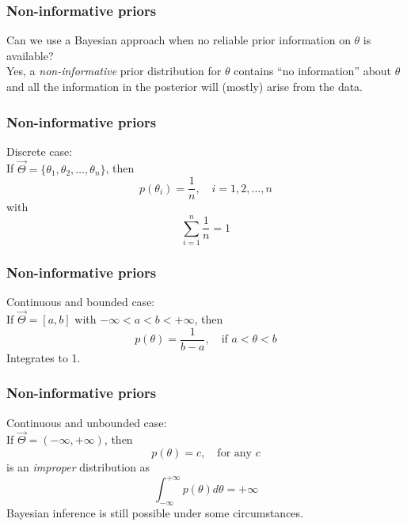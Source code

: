 \documentclass{beamer}
\newcommand{\1}{\ensuremath{\mathbf{1}}}
\begin{document}
%
%
%
\begin{frame}\frametitle{Non-informative priors}
	Can we use a Bayesian approach when no reliable prior information on $\theta$ is available?\\[2ex]
	Yes, a \emph{non-informative} prior distribution for $\theta$ contains ``no information'' about $\theta$ and all the information in the posterior will (mostly) arise from the data.
\end{frame}
%
%
%
\begin{frame}\frametitle{Non-informative priors}
	Discrete case:\\[1.5ex]
	If $\vec\Theta = \{\theta_1, \theta_2, \ldots, \theta_n\}$, then
	\begin{equation}
		p(\theta_i) = \frac{1}{n}, \quad i=1,2,\ldots,n	
	\end{equation}
	with
	\begin{equation}
		\sum_{i=1}^n \frac{1}{n} = 1
	\end{equation}
\end{frame}
%
%
%
\begin{frame}\frametitle{Non-informative priors}
	Continuous and bounded case:\\[1.5ex]
	If $\vec\Theta = [a,b]$ with $-\infty < a < b < +\infty$, then
	\begin{equation}
		p(\theta) = \frac{1}{b-a}, \quad \text{if $a < \theta < b$} 	
	\end{equation}
	Integrates to 1.
\end{frame}
%
%
%
\begin{frame}\frametitle{Non-informative priors}
	Continuous and unbounded case:\\[1.5ex]
	If $\vec\Theta = (-\infty, +\infty)$, then
	\begin{equation}
		p(\theta) = c, \quad \text{for any $c$} 	
	\end{equation}
	is an \emph{improper} distribution as
	\begin{equation}
		\int_{-\infty}^{+\infty} p(\theta) d\theta = +\infty
	\end{equation}
	Bayesian inference is still possible under some circumstances.
\end{frame}
\end{document}
